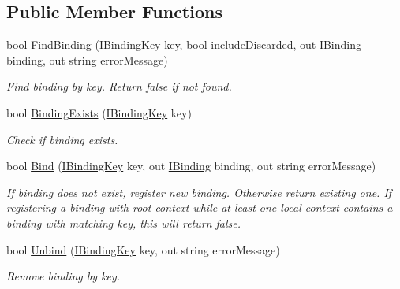 \subsection*{Public Member Functions}
\begin{DoxyCompactItemize}
\item 
bool \mbox{\hyperlink{interfacecp_games_1_1core_1_1_rapid_m_v_c_1_1_i_binding_collection_a38fe8a92150b2901ed27abeacef14b2e}{Find\+Binding}} (\mbox{\hyperlink{interfacecp_games_1_1core_1_1_rapid_m_v_c_1_1_i_binding_key}{I\+Binding\+Key}} key, bool include\+Discarded, out \mbox{\hyperlink{interfacecp_games_1_1core_1_1_rapid_m_v_c_1_1_i_binding}{I\+Binding}} binding, out string error\+Message)
\begin{DoxyCompactList}\small\item\em Find binding by key. Return false if not found. \end{DoxyCompactList}\item 
bool \mbox{\hyperlink{interfacecp_games_1_1core_1_1_rapid_m_v_c_1_1_i_binding_collection_a39534c8594adf07fb09af75f6d0a0de8}{Binding\+Exists}} (\mbox{\hyperlink{interfacecp_games_1_1core_1_1_rapid_m_v_c_1_1_i_binding_key}{I\+Binding\+Key}} key)
\begin{DoxyCompactList}\small\item\em Check if binding exists. \end{DoxyCompactList}\item 
bool \mbox{\hyperlink{interfacecp_games_1_1core_1_1_rapid_m_v_c_1_1_i_binding_collection_afff4c2ad2ff9fb25c906864bc28f036f}{Bind}} (\mbox{\hyperlink{interfacecp_games_1_1core_1_1_rapid_m_v_c_1_1_i_binding_key}{I\+Binding\+Key}} key, out \mbox{\hyperlink{interfacecp_games_1_1core_1_1_rapid_m_v_c_1_1_i_binding}{I\+Binding}} binding, out string error\+Message)
\begin{DoxyCompactList}\small\item\em If binding does not exist, register new binding. Otherwise return existing one. If registering a binding with root context while at least one local context contains a binding with matching key, this will return false. \end{DoxyCompactList}\item 
bool \mbox{\hyperlink{interfacecp_games_1_1core_1_1_rapid_m_v_c_1_1_i_binding_collection_ab20c12c64a91e24e7685780dd64f1d87}{Unbind}} (\mbox{\hyperlink{interfacecp_games_1_1core_1_1_rapid_m_v_c_1_1_i_binding_key}{I\+Binding\+Key}} key, out string error\+Message)
\begin{DoxyCompactList}\small\item\em Remove binding by key. \end{DoxyCompactList}\item 

\end{DoxyCompactItemize}
